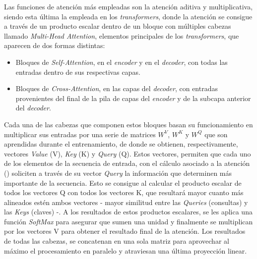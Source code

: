 Las funciones de atención más empleadas son la atención aditiva \cite{neuralmachinetranslationalignandtranslate} y multiplicativa, siendo esta última la empleada en los \textit{transformers}, donde la atención se consigue a través de un producto escalar dentro de un bloque con múltiples cabezas llamado \textit{Multi-Head Attention}, elementos principales de los \textit{transformers}, que aparecen de dos formas distintas:
\begin{itemize}
    \item Bloques de \textit{Self-Attention}, en el \textit{encoder} y en el \textit{decoder}, con todas las entradas dentro de sus respectivas capas.
    \item Bloques de \textit{Cross-Attention}, en las capas del \textit{decoder}, con entradas provenientes del final de la pila de capas del \textit{encoder} y de la subcapa anterior del \textit{decoder}.
\end{itemize}
Cada una de las cabezas que componen estos bloques basan su funcionamiento en multiplicar sus entradas por una serie de matrices $W^V$, $W^K$ y $W^Q$ que son aprendidas durante el entrenamiento, de donde se obtienen, respectivamente, vectores \textit{Value} (V), \textit{Key} (K) y \textit{Query} (Q). Estos vectores, permiten que cada uno de los elementos de la secuencia de entrada, con el cálculo asociado a la atención () soliciten a través de su vector \textit{Query} la información que determinen más importante de la secuencia. Esto se consigue al calcular el producto escalar de todos los vectores Q con todos los vectores K, que resultará mayor cuanto más alineados estén ambos vectores - mayor similitud entre las \textit{Queries} (consultas) y las \textit{Keys} (claves) -. A los resultados de estos productos escalares, se les aplica una función \textit{SoftMax} para asegurar que sumen una unidad y finalmente se multiplican por los vectores V para obtener el resultado final de la atención. Los resultados de todas las cabezas, se concatenan en una sola matriz para aprovechar al máximo el procesamiento en paralelo y atraviesan una última proyección linear.

